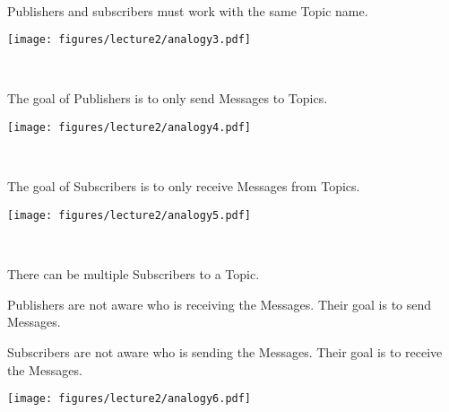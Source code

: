 \documentclass[usenames,11,dvipsnames,svgnames,x11names,aspectratio=1610,bibref]{beamer}
\newcommand{\mydisclaimer}{{\color{disclaimer}{\scriptsize ROS 2 -- Part I}}}
\renewcommand\sec{{\cnordSix{\secname}\hfill\mydisclaimer~} }
\begin{document}
\begin{frame}[fragile]{\sec}
\vspace*{\fill}
\begin{center} 
Publishers and subscribers must work with the same Topic name.

\texttt{[image: figures/lecture2/analogy3.pdf]}

\end{center}
\vspace*{\fill}
\end{frame}


\begin{frame}[fragile]{\sec}
\vspace*{\fill}
\begin{center} 
The goal of Publishers is to only send Messages to Topics.

\texttt{[image: figures/lecture2/analogy4.pdf]}

\end{center}
\vspace*{\fill}
\end{frame}


\begin{frame}[fragile]{\sec}
\vspace*{\fill}
\begin{center} 
The goal of Subscribers is to only receive Messages from Topics.

\texttt{[image: figures/lecture2/analogy5.pdf]}

\end{center}
\vspace*{\fill}
\end{frame}



\begin{frame}[fragile]{\sec}
\vspace*{\fill}
\begin{center} 
There can be multiple Subscribers to a Topic. 

\begin{compactitem}
\footnotesize
\item Publishers are not aware who is receiving the Messages. Their goal is to send Messages.
\item Subscribers are not aware who is sending the Messages. Their goal is to receive the Messages.
\end{compactitem}

\texttt{[image: figures/lecture2/analogy6.pdf]}

\end{center}
\vspace*{\fill}
\end{frame}
\end{document}
